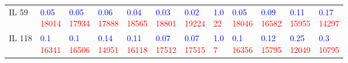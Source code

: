 \begin{tabular}{llllllllllll}
IL 59  &  \makecell{\textcolor{blue}{0.05} \\ \textcolor{red}{18014}} &  \makecell{\textcolor{blue}{0.05} \\ \textcolor{red}{17934}} &  \makecell{\textcolor{blue}{0.06} \\ \textcolor{red}{17888}} &  \makecell{\textcolor{blue}{0.04} \\ \textcolor{red}{18565}} &  \makecell{\textcolor{blue}{0.03} \\ \textcolor{red}{18801}} &  \makecell{\textcolor{blue}{0.02} \\ \textcolor{red}{19224}} &    \makecell{\textcolor{blue}{1.0} \\ \textcolor{red}{22}} &  \makecell{\textcolor{blue}{0.05} \\ \textcolor{red}{18046}} &  \makecell{\textcolor{blue}{0.09} \\ \textcolor{red}{16582}} &  \makecell{\textcolor{blue}{0.11} \\ \textcolor{red}{15955}} &  \makecell{\textcolor{blue}{0.17} \\ \textcolor{red}{14297}} \\
IL 118 &   \makecell{\textcolor{blue}{0.1} \\ \textcolor{red}{16341}} &   \makecell{\textcolor{blue}{0.1} \\ \textcolor{red}{16506}} &  \makecell{\textcolor{blue}{0.14} \\ \textcolor{red}{14951}} &  \makecell{\textcolor{blue}{0.11} \\ \textcolor{red}{16118}} &  \makecell{\textcolor{blue}{0.07} \\ \textcolor{red}{17512}} &  \makecell{\textcolor{blue}{0.07} \\ \textcolor{red}{17515}} &     \makecell{\textcolor{blue}{1.0} \\ \textcolor{red}{7}} &   \makecell{\textcolor{blue}{0.1} \\ \textcolor{red}{16356}} &  \makecell{\textcolor{blue}{0.12} \\ \textcolor{red}{15795}} &  \makecell{\textcolor{blue}{0.25} \\ \textcolor{red}{12049}} &   \makecell{\textcolor{blue}{0.3} \\ \textcolor{red}{10795}} \\

\end{tabular}
